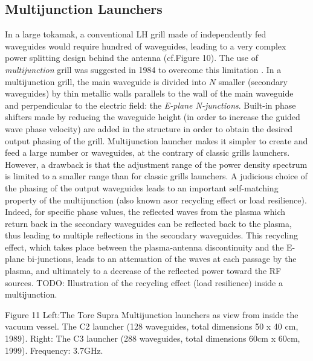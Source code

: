 \subsection{Multijunction Launchers}
In a large tokamak, a conventional LH grill made of independently fed waveguides would require hundred of waveguides, leading to a very complex power splitting design behind the antenna (cf.Figure 10). The use of \emph{multijunction} grill was suggested in 1984 to overcome this limitation \cite{Gormezano1985, Moreau1984}. In a multijunction grill, the main waveguide is divided into $N$ smaller (secondary waveguides) by thin metallic walls parallels to the wall of the main waveguide and perpendicular to the electric field: the \emph{E-plane N-junctions}. Built-in phase shifters made by reducing the waveguide height (in order to increase the guided wave phase velocity) are added in the structure in order to obtain the desired output phasing of the grill. Multijunction launcher makes it simpler to create and feed a large number or waveguides, at the contrary of classic grills launchers. However, a drawback is that the adjustment range of the power density spectrum is limited to a smaller range than for classic grills launchers.
A judicious choice of the phasing of the output waveguides leads to an important self-matching property of the multijunction (also known asor recycling effect or load resilience). Indeed, for specific phase values, the reflected waves from the plasma which return back in the secondary waveguides can be reflected back to the plasma, thus leading to multiple reflections in the secondary waveguides. This recycling effect, which takes place between the plasma-antenna discontinuity and the E-plane bi-junctions, leads to an attenuation of the waves at each passage by the plasma, and ultimately to a decrease of the reflected power toward the RF sources. 
TODO: Illustration of the recycling effect (load resilience) inside a multijunction.


Figure 11 Left:The Tore Supra Multijunction launchers as view from inside the vacuum vessel. The C2 launcher (128 waveguides, total dimensions 50 x 40 cm, 1989). Right: The C3 launcher (288 waveguides, total dimensions 60cm x 60cm, 1999). Frequency: 3.7GHz. 

